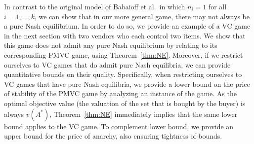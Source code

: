 In contrast to the original model of Babaioff et al.~in which $n_i=1$ for all $i=1,\ldots,k$, we can show that in our more general game, there may not always be a pure Nash equilibrium. In order to do so, we provide an example of a VC game in the next section with two vendors who each control two items. We show that this game does not admit any pure Nash equilibrium by relating to its corresponding PMVC game, using Theorem~\ref{thm:NE}.
Moreover, if we restrict ourselves to VC games that do admit pure Nash equilibria, we can provide quantitative bounds on their quality. Specifically, when restricting ourselves to VC games that have pure Nash equilibria, we provide a
lower bound on the price of stability of the PMVC game by analyzing an instance of the game. As the optimal objective value (the valuation of the set that is bought by the buyer) is always $v(A^*)$, Theorem~\ref{thm:NE} immediately implies that the same lower bound applies to the VC game. To complement lower bound, we provide an upper bound for the price of anarchy, also ensuring tightness of bounds.




